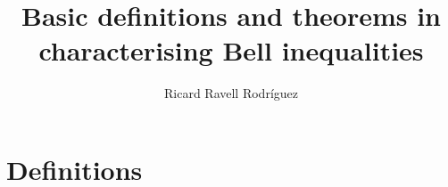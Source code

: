 \documentclass[a4paper,12pt]{article}
\title{Basic definitions and theorems in characterising Bell inequalities}
\author{Ricard Ravell Rodríguez}
\date{}
\begin{document}
\maketitle
{}
\section*{Definitions}
\end{document}
